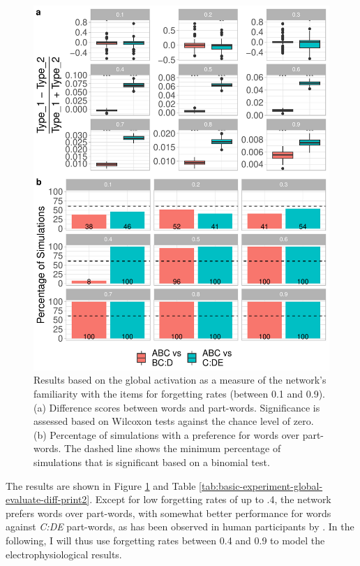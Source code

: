 \documentclass[
]{article}
\begin{document}
\begin{figure}
\includegraphics[width=1\linewidth]{tp_model_entrainment_files/figure-latex/basic-experiment-global-create-plot-combined-fw-plot-1} \caption{Results based on the global activation as a measure of the network's familiarity with the items for forgetting rates (between 0.1 and 0.9). (a) Difference scores between words and part-words. Significance is assessed based on Wilcoxon tests against the chance level of zero. (b) Percentage of simulations with a preference for words over part-words. The dashed line shows the minimum percentage of simulations that is significant based on a binomial test.}\label{fig:basic-experiment-global-create-plot-combined-fw-plot}
\end{figure}

The results are shown in Figure
\ref{fig:basic-experiment-global-create-plot-combined-fw-plot} and Table
\ref{tab:basic-experiment-global-evaluate-diff-print2}. Except for low
forgetting rates of up to .4, the network prefers words over part-words,
with somewhat better performance for words against \emph{C:DE}
part-words, as has been observed in human participants by
\citep{Fiser2002}. In the following, I will thus use forgetting rates
between 0.4 and 0.9 to model the electrophysiological results.
\end{document}
